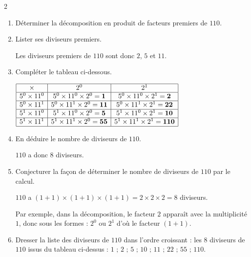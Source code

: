     \phantom{rrr}
    \begin{multicols}2
        \begin{enumerate}
            \item Déterminer la décomposition en produit de facteurs premiers de $110$.
            \item Lister ses diviseurs premiers.

            Les diviseurs premiers de $110$ sont donc $2$, $5$ et $11$.
            \item Compléter le tableau ci-dessous.

            \smallskip
            $\renewcommand{\arraystretch}{1}
            \begin{array}{|c|c|c|}
                \hline
                \times & 2^{0} & 2^{1}\\
                \hline
                5^{0}\times11^{0} & 5^{0}\times11^{0}\times2^{0}=\mathbf{1} & 5^{0}\times11^{0}\times2^{1}=\mathbf{2}\\
                \hline
                5^{0}\times11^{1} & 5^{0}\times11^{1}\times2^{0}=\mathbf{11} & 5^{0}\times11^{1}\times2^{1}=\mathbf{22}\\
                \hline
                5^{1}\times11^{0} & 5^{1}\times11^{0}\times2^{0}=\mathbf{5} & 5^{1}\times11^{0}\times2^{1}=\mathbf{10}\\
                \hline
                5^{1}\times11^{1} & 5^{1}\times11^{1}\times2^{0}=\mathbf{55} & 5^{1}\times11^{1}\times2^{1}=\mathbf{110}\\
                \hline
            \end{array}
            \renewcommand{\arraystretch}{1}$
            \smallskip

            \item En déduire le nombre de diviseurs de $110$.

            $110$ a donc $8$ diviseurs.

            \item Conjecturer la façon de déterminer le nombre de diviseurs de $110$ par le calcul.

            $110$ a $(1+1)\times(1+1)\times(1+1) = 2\times2\times2 = 8$ diviseurs.

            Par exemple, dans la décomposition, le facteur $2$ apparaît avec la multiplicité $1$, donc sous les formes : $2^{0}$ ou $2^{1}$ d'où le facteur $(1+1)$.
            \item Dresser la liste des diviseurs de $110$ dans l'ordre croissant : les $8$ diviseurs de $110$ issus du tableau ci-dessus : $1\text{ ; }2\text{ ; }5\text{ ; }10\text{ ; }11\text{ ; }22\text{ ; }55\text{ ; }110.$
        \end{enumerate}
    \end{multicols}
